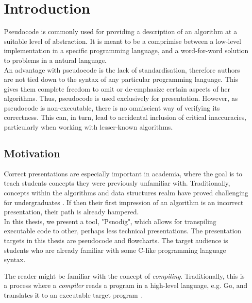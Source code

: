 \chapter{Introduction}

Pseudocode is commonly used for providing a description of an algorithm at a suitable level of abstraction. It is meant to be a comprimise between a low-level implementation in a specific programming language, and a word-for-word solution to problems in a natural language. \hfill \\


An advantage with pseudocode is the lack of standardisation, therefore authors are not tied down to the syntax of any particular programming language. This gives them complete freedom to omit or de-emphasize certain aspects of her algorithms. Thus, pseudocode is used exclusively for presentation. However, as pseudocode is non-executable, there is no omniscient way of verifying its correctness. This can, in turn, lead to accidental inclusion of critical inaccuracies, particularly when working with lesser-known algorithms. \hfill \\

\section{Motivation}

Correct presentations are especially important in academia, where the goal is to teach students concepts they were previously unfamiliar with. Traditionally, concepts within the algorithms and data structures realm have proved challenging for undergraduates \cite{10.1145/2157136.2157148}. If then their first impression of an algorithm is an incorrect presentation, their path is already hampered. \hfill \\

In this thesis, we present a tool, "Psnodig", which allows for transpiling executable code to other, perhaps less technical presentations. The presentation targets in this thesis are pseudocode and flowcharts. The target audience is students who are already familiar with some C-like programming language syntax.

The reader might be familiar with the concept of \textit{compiling}. Traditionally, this is a process where a \textit{compiler} reads a program in a high-level language, e.g. Go, and translates it to an executable target program \cite{DBLP:books/aw/AhoSU86}. \hfill \\

